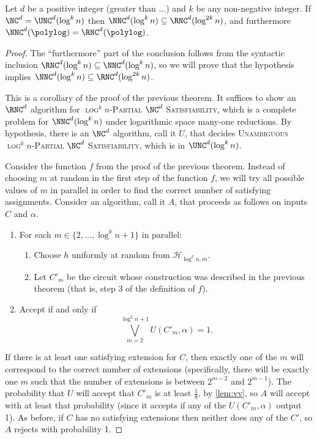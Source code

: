 \documentclass{article}
\newcommand{\PSAT}{\textsc{$\log^k n$-Partial $\NC^d$ Satisfiability}}
\newcommand{\UPSAT}{\textsc{Unambiguous $\log^k n$-Partial $\NC^d$ Satisfiability}}
\begin{document}
\begin{corollary}
  Let $d$ be a positive integer (greater than ...) and $k$ be any non-negative integer.
  If $\NC^d = \UNC^d(\log^k n)$ then $\NNC^d(\log^k n) \subseteq \RNC^d(\log^{2k} n)$, and furthermore $\NNC^d(\polylog) = \RNC^d(\polylog)$.
\end{corollary}
\begin{proof}
  The ``furthermore'' part of the conclusion follows from the syntactic inclusion $\RNC^d(\log^k n) \subseteq \NNC^d(\log^k n)$, so we will prove that the hypothesis implies $\NNC^d(\log^k n) \subseteq \RNC^d(\log^{2k} n)$.

  This is a corollary of the proof of the previous theorem.
  It suffices to show an $\RNC^d$ algorithm for \PSAT{}, which is a complete problem for $\NNC^d(\log^k n)$ under logarithmic space many-one reductions.
  By hypothesis, there is an $\NC^d$ algorithm, call it $U$, that decides \UPSAT{}, which is in $\UNC^d(\log^k n)$.

  Consider the function $f$ from the proof of the previous theorem.
  Instead of choosing $m$ at random in the first step of the function $f$, we will try all possible values of $m$ in parallel in order to find the correct number of satisfying assignments.
  Consider an algorithm, call it $A$, that proceeds as follows on inputs $C$ and $\alpha$.
  \begin{enumerate}
  \item For each $m \in \{2, \dotsc, \log^k n + 1\}$ in parallel:
    \begin{enumerate}
    \item Choose $h$ uniformly at random from $\mathcal{H}_{\log^k n, m}$.
    \item Let $C'_m$ be the circuit whose construction was described in the previous theorem (that is, step 3 of the definition of $f$).
    \end{enumerate}
  \item Accept if and only if
    \begin{equation*}
      \bigvee_{m=2}^{\log^k n + 1} U(C'_m, \alpha) = 1.
    \end{equation*}
  \end{enumerate}
  If there is at least one satisfying extension for $C$, then exactly one of the $m$ will correspond to the correct number of extensions (specifically, there will be exactly one $m$ such that the number of extensions is between $2^{m - 2}$ and $2^{m - 1}$).
  The probability that $U$ will accept that $C'_m$ is at least $\frac{1}{8}$, by \autoref{lem:vv}, so $A$ will accept with at least that probability (since it accepts if any of the $U(C'_m, \alpha)$ output 1).
  As before, if $C$ has no satisfying extensions then neither does any of the $C'$, so $A$ rejects with probability 1.


\end{proof}
\end{document}
